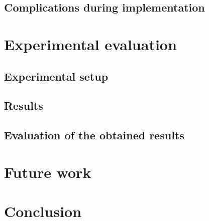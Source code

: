 \section{Complications during implementation}

\chapter{Experimental evaluation}

\section{Experimental setup}
\section{Results}
\section{Evaluation of the obtained results}

\chapter{Future work}

\chapter{Conclusion}